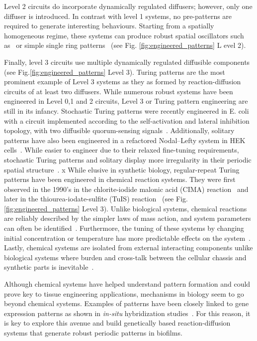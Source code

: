 Level 2 circuits do incorporate dynamically regulated diffusers; however, only one diffuser is introduced.
In contrast with level 1 systems, no pre-patterns are required to generate interesting behaviours.
Starting from a spatially homogeneous regime, these systems can produce robust spatial oscillators such as~\parencite{Danino2010} or simple single ring patterns~\parencite{Cao2016, Payne2013} (see Fig. \ref{fig:engineered_patterns} L evel 2).

Finally, level 3 circuits use multiple dynamically regulated diffusible components (see Fig.\ref{fig:engineered_patterns} Level 3).
Turing patterns are the most prominent example of Level 3 systems as they as formed by reaction-diffusion circuits of at least two diffusers.
While numerous robust systems have been engineered in Level 0,1 and 2 circuits, Level 3 or Turing pattern engineering are still in its infancy.
Stochastic Turing patterns were recently engineered in E. coli with a circuit implemented according to the self-activation and lateral inhibition topology, with two diffusible quorum-sensing signals~\parencite{Karig2018}.
Additionally, solitary patterns have also been engineered in a refactored Nodal–Lefty system in HEK cells~\parencite{Sekine2018}.
While easier to engineer due to their relaxed fine-tuning requirements, stochastic Turing patterns and solitary display more irregularity in their periodic spatial structure~\parencite{Butler2011, Karig2018,Sekine2018}.
x
While elusive in synthetic biology, regular-repeat Turing patterns have been engineered in chemical reaction systems.
They were first observed in the 1990's in the chlorite-iodide malonic acid (CIMA) reaction~\parencite{Castets, Lengyel1992} and later in the thiourea-iodate-sulfite (TuIS) reaction~\parencite{Horvath} (see Fig. \ref{fig:engineered_patterns} Level 3).
Unlike biological systems, chemical reactions are reliably described by the simpler laws of mass action, and system parameters can often be identified~\parencite{turanyi1994, kugler2009, Pusnik2019, Yeoh2019}.
Furthermore, the tuning of these systems by changing initial concentration or temperature has more predictable effects on the system~\parencite{Horvath, landeira2010, Asakura2011}.
Lastly, chemical systems are isolated from external interacting components unlike biological systems where burden and cross-talk between the cellular chassis and synthetic parts is inevitable~\parencite{Ceroni2015, Nielsen2016,Butzin2018, Du2020}.


Although chemical systems have helped understand pattern formation and could prove key to tissue engineering applications, mechanisms in biology seem to go beyond chemical systems.
Examples of patterns have been closely linked to gene expression patterns as shown in \textit{in-situ} hybridization studies~\parencite{Jing2006}.
For this reason, it is key to explore this avenue and build genetically based reaction-diffusion systems that generate robust periodic patterns in biofilms.


